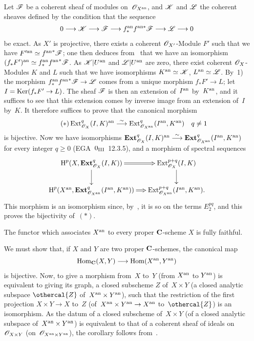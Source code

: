 Let $\cal{F}$ be a coherent sheaf of modules on~$\cal{O}_{X^{\an}}$, and $\cal{K}$ and $\cal{L}$ the coherent
sheaves defined by the condition that the sequence
$$
0\to\cal{K}\to\cal{F}\to f_*^{\an}f^{\an *}\cal{F}\to\cal{L}\to 0
$$
be exact. As $X'$ is projective, there exists a coherent
$\cal{O}_{X'}$-Module $F'$ such that we have
$F'^{\an}\simeq {f^{\an}}^*\cal{F}$; one then deduces
from~ that we have an isomorphism $(f_*F')^{\an}\simeq
f_*^{\an}{f^{\an}}^*\cal{F}$. As $\cal{K}|U^{\an}$ and
$\cal{L}|U^{\an}$ are zero, there exist coherent $\cal{O}_X$-Modules
$K$ and $L$ such that we have isomorphisms
$K^{\an}\simeq \cal{K}$, $L^{\an}\simeq \cal{L}$. By~1) the
morphism $f_*^{\an}{f^{\an}}^*\cal{F}\to\cal{L}$ comes from a unique
morphism $f_*F'\to L$; let $I=\Ker(f_*F'\to L)$. The sheaf
$\cal{F}$ is then an extension of~$I^{\mathrm{an}}$ by~$K^{\mathrm{an}}$, and it suffices
to see that this extension comes
by inverse image from an extension of~$I$ by~$K$. It therefore suffices to
prove that the canonical morphism
\begin{equation*}
\label{eq:XII.4.*}
\tag{$*$} \Ext_{\cal{O}_X}^q(I,K)^{\an}\isomto
\Ext_{\cal{O}_{X^{\an}}}^q(I^{\an},K^{\an})\quad q\neq 1
\end{equation*}
is bijective. Now we have isomorphisms
$\mathbf{Ext}_{\cal{O}_X}^q(I,K)^{\an}\isomto
\mathbf{Ext}_{\cal{O}_{X^{\an}}}^q(I^{\an},K^{\an})$ for every integer
$q\geq 0$ (EGA~$0_{\textup{III}}$~12.3.5), and a morphism of spectral
sequences
$$
\xymatrix@R=.7cm@C=.5cm{
\H^p(X,\mathbf{Ext}_{\cal{O}_X}^q(I,K))\ar@{=>}[r]\ar[d] &
\Ext_{\cal{O}_X}^{p+q}(I,K)\ar[d]\\
\H^p(X^{\an},\mathbf{Ext}_{\cal{O}_{X^{\an}}}^q(I^{\an},K^{\an}))\ar@{=>}[r] & \Ext_{\cal{O}_{X^{\an}}}^{p+q}(I^{\an},K^{\an}).
}
$$
This morphism is an isomorphism since, by~, it
is so on the terms $E^{pq}_2$, and this proves the
bijectivity of~$(*)$.

\begin{corollary}
\label{XII.4.5}
The functor which associates $X^{\mathrm{an}}$ to every proper $\mathbf{C}$-scheme
$X$ is fully faithful.
\end{corollary}

We must show that, if $X$ and $Y$ are two proper
$\mathbf{C}$-schemes, the canonical map
$$
\Hom_{\CC}(X,Y)\to\Hom(X^{\an},Y^{\an})
$$
is bijective. Now, to give a morphism from~$X$ to~$Y$ (\resp from
$X^{\mathrm{an}}$ to $Y^{\mathrm{an}}$) is equivalent to giving its graph,
\ie a closed subscheme $Z$ of~$X\times Y$ (\resp a closed
analytic subspace $\othercal{Z}$ of~$X^{\mathrm{an}}\times
Y^{\mathrm{an}}$), such that the restriction of the first projection
$X\times Y\to X$ to~$Z$ (\resp of~$X^{\an}\times Y^{\an}\to
X^{\an}$ to~$\othercal{Z}$) is
an isomorphism. As the datum of a closed subscheme
of~$X\times Y$ (\resp of a closed analytic subspace
of~$X^{\mathrm{an}}\times Y^{\mathrm{an}}$) is equivalent to that of a coherent
sheaf of ideals on~$\cal{O}_{X\times Y}$ (\resp on~$\cal{O}_{X^{\an}\times Y^{\an}}$), the corollary follows
from~.

